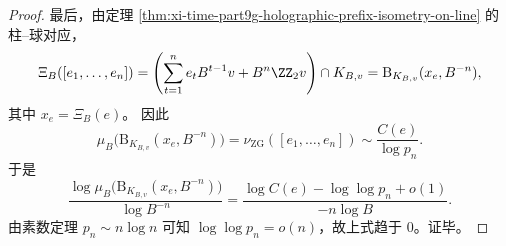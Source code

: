 \begin{proof}
最后，由定理 \ref{thm:xi-time-part9g-holographic-prefix-isometry-on-line} 的柱--球对应，
\[
\Xi_B([e_1,\dots,e_n])
=
\left(\sum_{t=1}^{n}e_tB^{t-1}v+B^n\ZZ_2v\right)\cap K_{B,v}
=
\mathrm B_{K_{B,v}}(x_e,B^{-n}),
\]
其中 \(x_e=\Xi_B(e)\)。
因此
\[
\mu_B\bigl(\mathrm B_{K_{B,v}}(x_e,B^{-n})\bigr)
=
\nu_{\mathrm{ZG}}([e_1,\dots,e_n])
\sim
\frac{C(e)}{\log p_n}.
\]
于是
\[
\frac{\log \mu_B\bigl(\mathrm B_{K_{B,v}}(x_e,B^{-n})\bigr)}{\log B^{-n}}
=
\frac{\log C(e)-\log\log p_n+o(1)}{-n\log B}.
\]
由素数定理 \(p_n\sim n\log n\) 可知 \(\log\log p_n=o(n)\)，故上式趋于 \(0\)。证毕。
\end{proof}



\endinput
